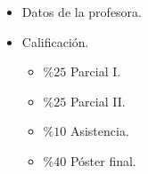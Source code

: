 
\begin{itemize}
  \item Datos de la profesora.
  \item Calificación.
    \begin{itemize}
      \item $\%25$ Parcial I.
      \item $\%25$ Parcial II.
      \item $\%10$ Asistencia.
      \item $\%40$ Póster final. 
    \end{itemize}
\end{itemize}

